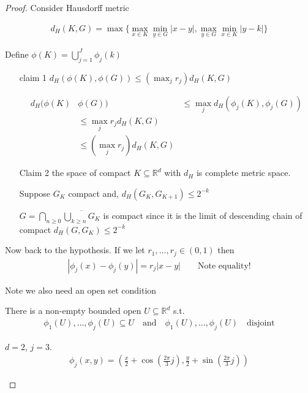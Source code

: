 \begin{proof}
	Consider Hausdorff metric

	\begin{align*}
		d_H (K,G) = \max\{\max_{x\in K} \min_{y \in G} |x - y|, \max_{y\in G} \min_{x \in K} |y - k|\}
	\end{align*} 

	Define $\phi(K) =  \bigcup_{j=1}^{J} \phi_{j}(k)$

	\begin{enumerate}
		\item[claim 1] $d_H(\phi(K), \phi(G)) \leq  (\max_{j} r_j	) d_{H}(K,G)$

			\begin{align*}
				d_H (\phi(K) &\phi(G)) &\leq \max_{j} d_{H} (\phi_{j}(K), \phi_{j} (G)) \\
							 &\leq \max_{j} r_{j} d_{H}(K,G) \\
							 &\leq (\max_{j} r_{j}) d_{H}(K,G)
			\end{align*} 

		\item[Claim 2] the space of compact $K \subseteq \mathbb{R}^d$ with $d_H$ is complete metric space.

			Suppose $G_{K}$ compact and, $d_{H} (G_{K}, G_{K+1}) \leq 2^{-k}$

		$G = \bigcap_{n \geq 0} \overline{\bigcup_{k \geq n} G_{K}}$
		is compact since it is the limit of descending chain of compact $d_{H}(G, G_{K}) \leq 2^{-k}$

	\end{enumerate}
	Now back to the hypothesis. If we let 
	$r_1, \ldots, r_j \in (0,1)$ then
	\begin{align*}
		|\phi_j (x) - \phi_{j} (y) | = r_{j} |x - y| \qquad \text{Note equality!}
	\end{align*} 

	Note we also need an open set condition

	\begin{remark}
		There is a non-empty bounded open $U \subseteq \mathbb{R}^d$ s.t.
		\begin{align*}
			\phi_{1}(U), \ldots, \phi_{j}(U) \subseteq U \quad \text{and} \quad \phi_{1} (U), \ldots, \phi_{j} (U) \quad \text{disjoint}
		\end{align*} 

	\end{remark}
	
	\begin{example}
		$d = 2$, $j=3$.
		 \begin{align*}
		\phi_{j} (x,y) = \left(\frac{x}{2} + \cos( \frac{2\pi}{3}j), \frac{y}{2} + \sin( \frac{2\pi}{3}j)\right)
		\end{align*} 
	\end{example}
	
\end{proof}




